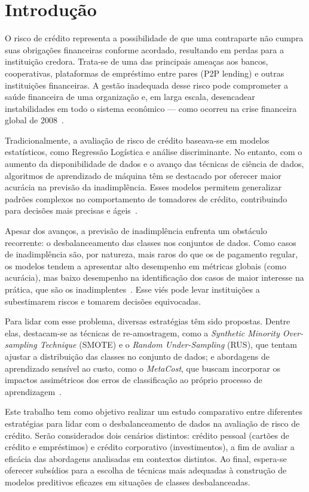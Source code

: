 \chapter[Introdução]{Introdução}\label{cap:introducao}

O risco de crédito representa a possibilidade de que uma contraparte não cumpra suas obrigações financeiras conforme acordado, resultando em perdas para a instituição credora. Trata-se de uma das principais ameaças aos bancos, cooperativas, plataformas de empréstimo entre pares (P2P lending) e outras instituições financeiras. A gestão inadequada desse risco pode comprometer a saúde financeira de uma organização e, em larga escala, desencadear instabilidades em todo o sistema econômico — como ocorreu na crise financeira global de 2008~\cite{Christiano2008}.

Tradicionalmente, a avaliação de risco de crédito baseava-se em modelos estatísticos, como Regressão Logística e análise discriminante. No entanto, com o aumento da disponibilidade de dados e o avanço das técnicas de ciência de dados, algoritmos de aprendizado de máquina têm se destacado por oferecer maior acurácia na previsão da inadimplência. Esses modelos permitem generalizar padrões complexos no comportamento de tomadores de crédito, contribuindo para decisões mais precisas e ágeis~\cite{Shi2022}.

Apesar dos avanços, a previsão de inadimplência enfrenta um obstáculo recorrente: o desbalanceamento das classes nos conjuntos de dados. Como casos de inadimplência são, por natureza, mais raros do que os de pagamento regular, os modelos tendem a apresentar alto desempenho em métricas globais (como acurácia), mas baixo desempenho na identificação dos casos de maior interesse na prática, que são os inadimplentes~\cite{Namvar2018}. Esse viés pode levar instituições a subestimarem riscos e tomarem decisões equivocadas.

Para lidar com esse problema, diversas estratégias têm sido propostas. Dentre elas, destacam-se as técnicas de re-amostragem, como a \textit{Synthetic Minority Over-sampling Technique} (SMOTE) e o \textit{Random Under-Sampling} (RUS), que tentam ajustar a distribuição das classes no conjunto de dados; e abordagens de aprendizado sensível ao custo, como o \textit{MetaCost}, que buscam incorporar os impactos assimétricos dos erros de classificação ao próprio processo de aprendizagem~\cite{FernndezCs2018,Wei2025}.

Este trabalho tem como objetivo realizar um estudo comparativo entre diferentes estratégias para lidar com o desbalanceamento de dados na avaliação de risco de crédito. Serão considerados dois cenários distintos: crédito pessoal (cartões de crédito e empréstimos) e crédito corporativo (investimentos), a fim de avaliar a eficácia das abordagens analisadas em contextos distintos. Ao final, espera-se oferecer subsídios para a escolha de técnicas mais adequadas à construção de modelos preditivos eficazes em situações de classes desbalanceadas.

